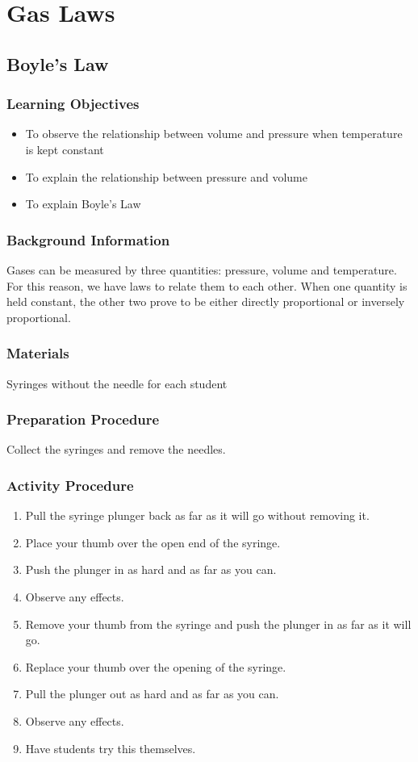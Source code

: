 \section{Gas Laws}

\subsection{Boyle's Law}

\subsubsection*{Learning Objectives}
\begin{itemize}
\item{To observe the relationship between volume and pressure when temperature is kept constant} 
\item{To explain the relationship between pressure and volume} 
\item{To explain Boyle's Law} 
\end{itemize}

\subsubsection*{Background Information}
Gases can be measured by three quantities: pressure, volume and temperature. For this reason, we have laws to relate them to each other. When one quantity is held constant, the other two prove to be either directly proportional or inversely proportional.  

\subsubsection*{Materials}
Syringes without the needle for each student

\subsubsection*{Preparation Procedure}
Collect the syringes and remove the needles.

\subsubsection*{Activity Procedure}
\begin{enumerate}
\item{Pull the syringe plunger back as far as it will go without removing it.} 
\item{Place your thumb over the open end of the syringe.} 
\item{Push the plunger in as hard and as far as you can.} 
\item{Observe any effects.} 
\item{Remove your thumb from the syringe and push the plunger in as far as it will go.} 
\item{Replace your thumb over the opening of the syringe.} 
\item{Pull the plunger out as hard and as far as you can.} 
\item{Observe any effects.} 
\item{Have students try this themselves.} 
\end{enumerate}

